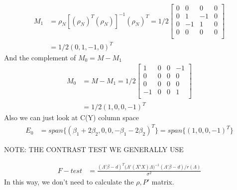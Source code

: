 \begin{itemize}
\begin{align*}
    M_1 &= \rho_N [(\rho_N)^T (\rho_N)]^{-1} (\rho_N)^T =1/2 \begin{bmatrix}
           0  & 0 & 0 & 0  \\
           0 &  1 & -1 & 0\\
           0  & -1 & 1 & 0 \\
           0 & 0 & 0 & 0\\
         \end{bmatrix} \\
         & = 1/2 (0, 1, -1, 0)^T
\end{align*}
And the complement of $M_0 = M- M_1$ 
\begin{align*}
    M_0 & = M- M_1 = 1/2 \begin{bmatrix}
           1  & 0 & 0 & -1  \\
           0 & 0 & 0 & 0\\
           0 & 0 & 0 & 0\\
           -1  & 0 & 0 & 1  \\
         \end{bmatrix} \\
         & = 1/2 (1, 0,  0, -1)^T
\end{align*}
Also we can just look at C(Y) column space
\begin{align*}
    E_0 & = span \{(\beta_1+2\beta_2, 0, 0, -\beta_1-2\beta_2)^T \}= span \{(1, 0,  0, -1)^T \}
\end{align*}


NOTE: THE CONTRAST TEST WE GENERALLY USE 

\begin{align*}
    F-test & = \frac{(\Lambda' \beta -d)^T \Big (\Lambda' (X'X) \Lambda \Big)^{-1}  (\Lambda' \beta -d) \Big / r(\Lambda)}{\sigma^2}
\end{align*}
In this way, we don't need to calculate the $\rho, P'$ matrix.


\end{itemize}
